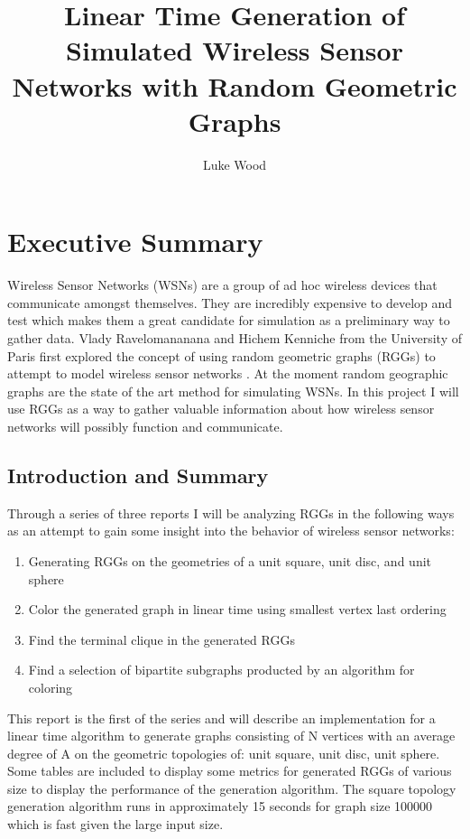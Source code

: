 \documentclass{article}
\begin{document}
  \title{Linear Time Generation of Simulated Wireless Sensor Networks with Random Geometric Graphs}
  \author{Luke Wood}
  \maketitle

  \section{Executive Summary}
	Wireless Sensor Networks (WSNs) are a group of ad hoc wireless devices that communicate amongst themselves.
	They are incredibly expensive to develop and test which makes them a great candidate for simulation as a preliminary way to gather data.
	Vlady Ravelomananana and Hichem Kenniche from the University of Paris first explored the concept of using random geometric graphs (RGGs) to attempt to model wireless sensor networks \cite{kenniche2010random}.
  At the moment random geographic graphs are the state of the art method for simulating WSNs.
	In this project I will use RGGs as a way to gather valuable information about how wireless sensor networks will possibly function and communicate.

  \subsection{Introduction and Summary}
	Through a series of three reports	I will be analyzing RGGs in the following ways as an attempt to gain some insight into the behavior of wireless sensor networks:
	\begin{enumerate}
		\item Generating RGGs on the geometries of a unit square, unit disc, and unit sphere
		\item Color the generated graph in linear time using smallest vertex last ordering
		\item Find the terminal clique in the generated RGGs
		\item Find a selection of bipartite subgraphs producted by an algorithm for coloring
	\end{enumerate}
	This report is the first of the series and will describe an implementation for a linear time algorithm to generate graphs consisting of N vertices with an average degree of A on the geometric topologies of: unit square, unit disc, unit sphere.
	Some tables are included to display some metrics for generated  RGGs of various size to display the performance of the generation algorithm.
	The square topology generation algorithm runs in approximately 15 seconds for graph size 100000 which is fast given the large input size.
\end{document}
